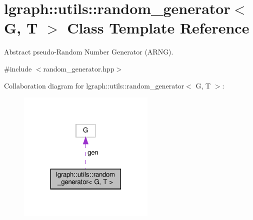 \hypertarget{classlgraph_1_1utils_1_1random__generator}{}\section{lgraph\+:\+:utils\+:\+:random\+\_\+generator$<$ G, T $>$ Class Template Reference}
\label{classlgraph_1_1utils_1_1random__generator}


Abstract pseudo-\/\+Random Number Generator (A\+R\+NG).  




{\ttfamily \#include $<$random\+\_\+generator.\+hpp$>$}



Collaboration diagram for lgraph\+:\+:utils\+:\+:random\+\_\+generator$<$ G, T $>$\+:\nopagebreak
\begin{figure}[H]
\begin{center}
\leavevmode
\includegraphics[width=185pt]{classlgraph_1_1utils_1_1random__generator__coll__graph}
\end{center}
\end{figure}
